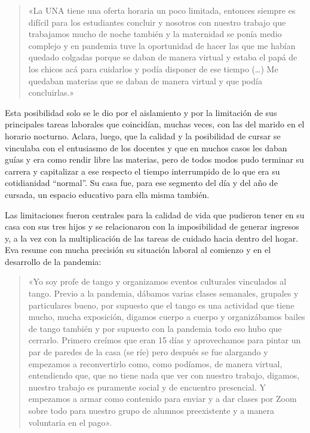 \begin{quote}
«La UNA tiene una oferta horaria un poco limitada, entonces siempre es difícil para los estudiantes concluir y nosotros con nuestro trabajo que trabajamos mucho de noche también y la maternidad se ponía medio complejo y en pandemia tuve la oportunidad de hacer las que me habían quedado colgadas porque se daban de manera virtual y estaba el papá de los chicos acá para cuidarlos y podía disponer de ese tiempo (\ldots) Me quedaban materias que se daban de manera virtual y que podía concluirlas.»
\end{quote}

Esta posibilidad solo se le dio por el aislamiento y por la limitación de sus principales tareas laborales que coincidían, muchas veces, con las del marido en el horario nocturno. Aclara, luego, que la calidad y la posibilidad de cursar se vinculaba con el entusiasmo de los docentes y que en muchos casos les daban guías y era como rendir libre las materias, pero de todos modos pudo terminar su carrera y capitalizar a ese respecto el tiempo interrumpido de lo que era su cotidianidad ``normal''. Su casa fue, para ese segmento del día y del año de cursada, un espacio educativo para ella misma también.

Las limitaciones fueron centrales para la calidad de vida que pudieron tener en su casa con sus tres hijos y se relacionaron con la imposibilidad de generar ingresos y, a la vez con la multiplicación de las tareas de cuidado hacia dentro del hogar. Eva resume con mucha precisión su situación laboral al comienzo y en el desarrollo de la pandemia:

\begin{quote}
«Yo soy profe de tango y organizamos eventos culturales vinculados al tango. Previo a la pandemia, dábamos varias clases semanales, grupales y particulares bueno, por supuesto que el tango es una actividad que tiene mucho, mucha exposición, digamos cuerpo a cuerpo y organizábamos bailes de tango también y por supuesto con la pandemia todo eso hubo que cerrarlo. Primero creímos que eran 15 días y aprovechamos para pintar un par de paredes de la casa (se ríe) pero después se fue alargando y empezamos a reconvertirlo como, como podíamos, de manera virtual, entendiendo que, que no tiene nada que ver con nuestro trabajo, digamos, nuestro trabajo es puramente social y de encuentro presencial. Y empezamos a armar como contenido para enviar y a dar clases por Zoom sobre todo para nuestro grupo de alumnos preexistente y a manera voluntaria en el pago».
\end{quote}

